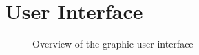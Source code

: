 \documentclass[11pt, a4paper]{report}
\begin{document}
\section{User Interface}

\begin{figure}[ht]
\centering
\setlength\fboxsep{2pt}
\setlength\fboxrule{0.2pt}
\caption{Overview of the graphic user interface}
\label{sec:GUI}
\label{fig:GUI}
\end{figure}
\end{document}
